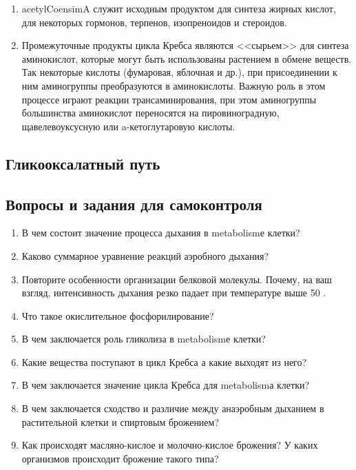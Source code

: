 \begin{enumerate}

\item \gls{acetylCoensimA} служит исходным продуктом для синтеза жирных кислот, для некоторых гормонов, терпенов, изопреноидов и стероидов.
\item Промежуточные продукты цикла Кребса являются <<сырьем>> для синтеза аминокислот, которые могут быть использованы растением в обмене веществ. Так некоторые кислоты (фумаровая, яблочная и др.), при присоединении к ним аминогруппы преобразуются в аминокислоты. Важную роль в этом процессе играют реакции трансаминирования, при этом аминогруппы большинства аминокислот переносятся на пировиноградную, щавелевоуксусную или a-кетоглутаровую кислоты.

\end{enumerate}

\subsection*{Гликооксалатный путь}

\subsection*{Вопросы и задания для самоконтроля}

\begin{enumerate}

\item В чем состоит значение процесса дыхания в \gls{metabolism}е клетки? 
\item Каково суммарное уравнение реакций аэробного дыхания? 
\item Повторите особенности организации белковой молекулы. Почему, на ваш взгляд, интенсивность дыхания резко \hypertarget{question_van_goff}{падает} при температуре выше 50 \celsius.
\item Что такое окислительное фосфорилирование? 
\item В чем заключается роль гликолиза в \gls{metabolism}е клетки? 
\item Какие вещества поступают в цикл Кребса а какие выходят из него?
\item В чем заключается значение цикла Кребса для \gls{metabolism}а клетки?
\item В чем заключается сходство и различие между анаэробным дыханием в растительной клетки и спиртовым брожением?
\item Как происходят масляно-кислое и молочно-кислое брожения? У каких организмов происходит брожение такого типа?

\end{enumerate}
